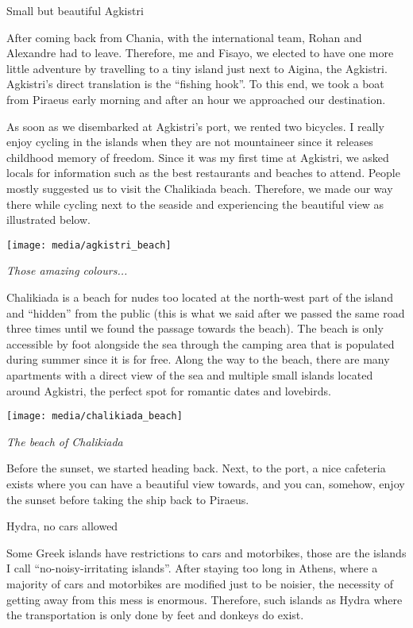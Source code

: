 \documentclass[10pt,a4paper]{article} %
\newcommand{\NewsItem}[1]{ %
\usefont{T1}{fvs}{n}{n} %
\vspace{24pt}\large #1\vspace{3pt} %
\par \normalsize \normalfont}
\begin{document}
\begin{multicols}{3}
\NewsItem{Small but beautiful Agkistri}
After coming back from Chania, with the international team, 
Rohan and Alexandre had to leave. 
Therefore, me and Fisayo, we elected to have one more little adventure
by travelling to a tiny island just next to Aigina, the Agkistri. 
Agkistri's direct translation is the ``fishing hook''. 
To this end, we took a boat from Piraeus early morning and after an hour
we approached our destination.

As soon as we disembarked at Agkistri's port, we rented two bicycles. 
I really enjoy cycling in the islands when they are not mountaineer
since it releases childhood memory of freedom.  
Since it was my first time at Agkistri, we asked locals for information
such as the best restaurants and beaches to attend. 
People mostly suggested us to visit the Chalikiada beach. 
Therefore, we made our way there while cycling next to the seaside
and experiencing the beautiful view as illustrated below.

\begin{center}
	\texttt{[image: media/agkistri\_beach]}
	\par\textit{Those amazing colours...}
\end{center}

Chalikiada is a beach for nudes too located at the north-west part of the island
and ``hidden'' from the public (this is what we said after we passed the same road
three times until we found the passage towards the beach).  
The beach is only accessible by foot alongside the sea through the camping area
that is populated during summer since it is for free. 
Along the way to the beach, there are many apartments with a direct view of the sea 
and multiple small islands located around Agkistri, the perfect spot for romantic dates
and lovebirds.

\begin{center}
	\texttt{[image: media/chalikiada\_beach]}
	\par\textit{The beach of Chalikiada}
\end{center}

Before the sunset, we started heading back.
Next, to the port, a nice cafeteria exists where you can have a beautiful view towards,
and you can, somehow, enjoy the sunset before taking the ship back to Piraeus.

\NewsItem{Hydra, no cars allowed}
Some Greek islands have restrictions to cars and motorbikes,
those are the islands I call ``no-noisy-irritating islands''. 
After staying too long in Athens,
where a majority of cars and motorbikes are modified just to be noisier,
the necessity of getting away from this mess is enormous. 
Therefore, such islands as Hydra where the transportation is only done
by feet and donkeys do exist. 


\end{multicols}
\end{document}
